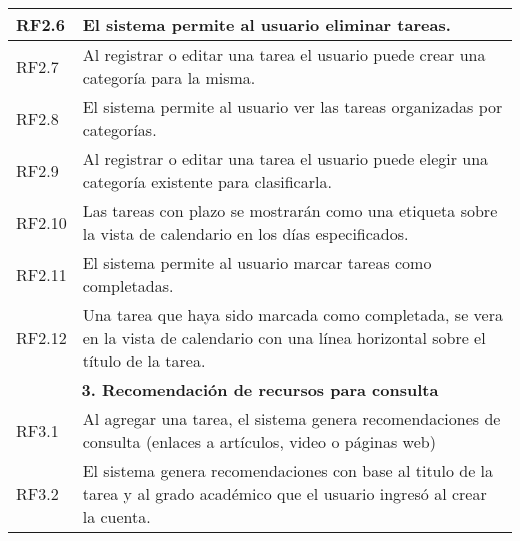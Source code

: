 \documentclass[11pt]{article}
\begin{document}
\begin{table}[H]
\begin{tabular}{|p{2cm}|p{13cm}|}
    \hline
    RF2.6 & El sistema permite al usuario eliminar tareas. \\
    \hline
    RF2.7 & Al registrar o editar una tarea el usuario puede crear una categoría para la misma.\\
    \hline
    RF2.8 & El sistema permite al usuario ver las tareas organizadas por categorías. \\
    \hline
    RF2.9 & Al registrar o editar una tarea el usuario puede elegir una categoría existente para clasificarla.\\
    \hline
    RF2.10 & Las tareas con plazo se mostrarán como una etiqueta sobre la vista de calendario en los días especificados.\\
    \hline
    RF2.11 & El sistema permite al usuario marcar tareas como completadas. \\
    \hline
    RF2.12 & Una tarea que haya sido marcada como completada, se vera en la vista de calendario con una línea horizontal sobre el título de la tarea.\\
    \hline
    \multicolumn{2}{|c|}{\textbf{3. Recomendación de recursos para consulta}} \\
    \hline
    RF3.1 & Al agregar una tarea, el sistema genera recomendaciones de consulta (enlaces a artículos, video o páginas web)  \\
    \hline
    RF3.2 & El sistema genera recomendaciones con base al titulo de la tarea y al grado académico que el usuario ingresó al crear la cuenta.\\   
    \hline
    
    \end{tabular}

    \label{tab:wumpus}
\end{table}
\end{document}
